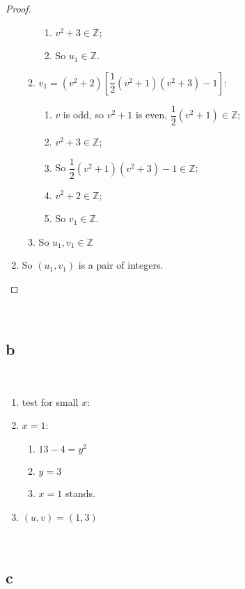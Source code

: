 \documentclass{article}
\begin{document}
\begin{proof}
\begin{enumerate}
\begin{enumerate}
\begin{enumerate}
                \item $v^2+3\in\mathbb{Z}$;
                \item So $u_1\in\mathbb{Z}$.
            \end{enumerate}
            \item $v_1=(v^2+2)\left[\dfrac{1}{2}(v^2+1)(v^2+3)-1\right]$:
            \begin{enumerate}
                \item $v$ is odd, so $v^2+1$ is even, $\dfrac{1}{2}(v^2+1)\in\mathbb{Z}$;
                \item $v^2+3\in\mathbb{Z}$;
                \item So $\dfrac{1}{2}(v^2+1)(v^2+3)-1\in\mathbb{Z}$;
                \item $v^2+2\in\mathbb{Z}$;
                \item So $v_1\in\mathbb{Z}$.
            \end{enumerate}
            \item So $u_1,v_1\in\mathbb{Z}$
        \end{enumerate}
        \item So $(u_1,v_1)$ is a pair of integers.
    \end{enumerate}
\end{proof}

~

\subsection*{b}

~

\begin{enumerate}
    \item test for small $x$:
    \item $x=1$:
    \begin{enumerate}
        \item $13-4=y^2$\\
        \item $y=3$\\
        \item $x=1$ stands.
    \end{enumerate}
    \item $(u,v)=(1,3)$
\end{enumerate}

~

\subsection*{c}
\end{document}
